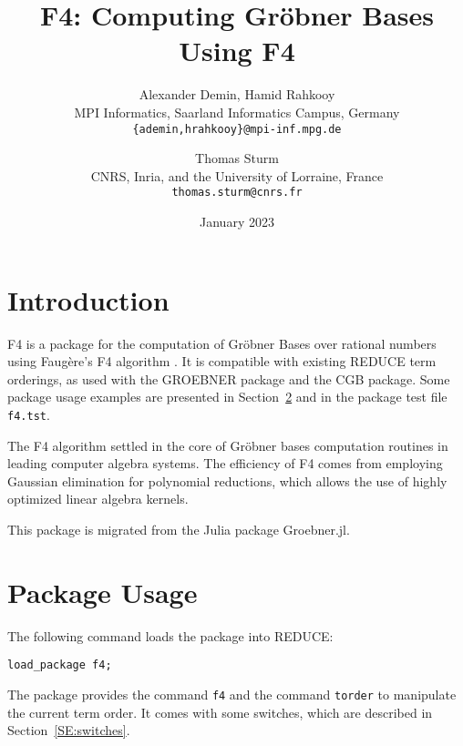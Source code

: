 \documentclass{article}
\newcommand{\grobner}{Gr\"obner}
\newcommand{\faugere}{Faug\`ere}
\newcommand{\code}[1]{\texttt{#1}}
\begin{document}
\title{F4: Computing Gröbner Bases Using F4}

\author{Alexander Demin, Hamid Rahkooy\\
  MPI Informatics, Saarland Informatics Campus, Germany\\
  \texttt{\{ademin,hrahkooy\}@mpi-inf.mpg.de}
  \and
  Thomas Sturm\\
  CNRS, Inria, and the University of Lorraine, France\\
  \texttt{thomas.sturm@cnrs.fr}
}

\date{January 2023}

\maketitle

\section{Introduction}

F4 is a package for the computation of \grobner{} Bases over rational numbers
using \faugere{}'s F4 algorithm \cite{f4}. It is compatible with existing REDUCE term
orderings, as used with the GROEBNER package and the CGB package. Some package usage examples are
presented in Section~\ref{SE:usage} and in the package test file
\code{f4.tst}.

The F4 algorithm settled in the core of \grobner{} bases computation routines in leading 
computer algebra systems. The efficiency of F4 comes from employing Gaussian elimination
for polynomial reductions, which allows the use of highly optimized linear algebra kernels.

This package is migrated from the Julia package Groebner.jl.

\section{Package Usage}\label{SE:usage}

The following command loads the package into REDUCE:
%
\begin{center}
    \code{load\_package f4;}
\end{center}

The package provides the command \code{f4} and the command \code{torder} to manipulate the current
term order. It comes with some switches, which are described in Section~\ref{SE:switches}.
\end{document}

